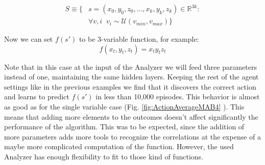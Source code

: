 \documentclass[11pt,a4paper,twoside]{report}
\newcommand{\+}{\textnormal{+} }
\theoremstyle{definition}
\numberwithin{equation}{chapter}
\begin{document}
    \begin{align}
      S\equiv\{&s=(x_0,y_0,z_0,...,x_k,y_k,z_k) \in \mathbb{R}^{3k}: \\
      & \forall v,i \; \; v_i \sim \mathcal{U}(v_{min},v_{max})
      \}
    \end{align}

    Now we can set $f(s')$ to be 3-variable function, for example:
    \begin{equation}
      f(x_t,y_t,z_t)=x_ty_tz_t
    \end{equation}

    Note that in this case at the input of the Analyzer we will feed three
    parameters instead of one, maintaining the same hidden layers. Keeping the
    rest of the agent settings like in the previous examples we find that it
    discovers the correct action and learns to predict $f(s')$ in less than
    10,000 episodes. This behavior is almost as good as for the single variable
    case (Fig. \ref{fig:ActionAverageMAB4} ). This means that adding more
    elements to the outcomes doesn't affect significantly the performance of the
    algorithm. This was to be expected, since the addition of more parameters
    adds more tools to recognize the correlations at the expense of a maybe more
    complicated computation of the function. However, the used Analyzer has
    enough flexibility to fit to those kind of functions.
\end{document}
